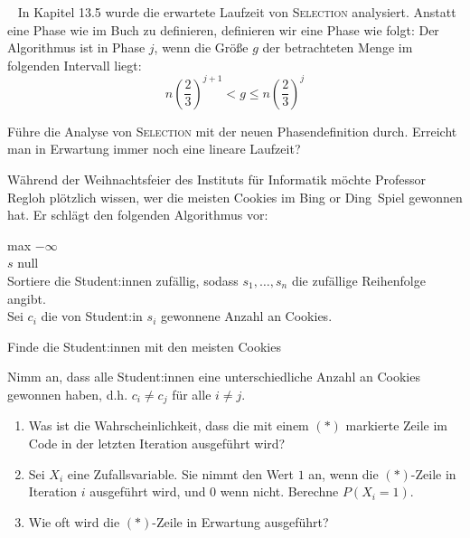 \documentclass{uebung_cs}
\begin{document}
\begin{aufgabe}\
	In Kapitel 13.5 wurde die erwartete Laufzeit von \textsc{Selection} analysiert.
	Anstatt eine Phase wie im Buch zu definieren, definieren wir eine Phase wie folgt:
	Der Algorithmus ist in Phase $j$, wenn die Größe $g$ der betrachteten Menge im folgenden Intervall liegt:
	\[n\left(\frac{2}{3}\right)^{j+1} < g \leq n\left(\frac{2}{3}\right)^j \]
	
	Führe die Analyse von \textsc{Selection} mit der neuen Phasendefinition durch. Erreicht man in Erwartung immer noch eine lineare Laufzeit?
\end{aufgabe}    

\begin{aufgabe}[Weihnachtsfeier im Institut]
	Während der Weihnachtsfeier des Instituts für Informatik möchte Professor Regloh plötzlich wissen, wer die meisten Cookies im \glqq Bing or Ding\grqq{}~Spiel gewonnen hat. Er schlägt den folgenden Algorithmus vor:
	
	\begin{algorithm}[H]
		\SetAlgoLined
		max \gets $- \infty$\\
		$s$ \gets null\\
		Sortiere die Student:innen zufällig, sodass $s_1,\dots,s_n$ die zufällige Reihenfolge angibt.\\
		Sei $c_i$ die von Student:in $s_i$ gewonnene Anzahl an Cookies.\\
		\caption{Finde die Student:innen mit den meisten Cookies}
\end{algorithm}
	
	Nimm an, dass alle Student:innen eine unterschiedliche Anzahl an Cookies gewonnen haben, d.h. $c_i \neq c_j$ für alle $i \neq j$.
	\begin{enumerate}
		\item Was ist die Wahrscheinlichkeit, dass die mit einem $(\ast)$ markierte Zeile im Code in der letzten Iteration ausgeführt wird?\\
		\item Sei $X_i$ eine Zufallsvariable. Sie nimmt den Wert $1$ an, wenn die $(\ast)$-Zeile in Iteration $i$ ausgeführt wird, und $0$ wenn nicht. Berechne $P(X_i = 1)$.\\%
		\item Wie oft wird die $(\ast)$-Zeile in Erwartung ausgeführt?
	\end{enumerate}
\end{aufgabe}
\end{document}
